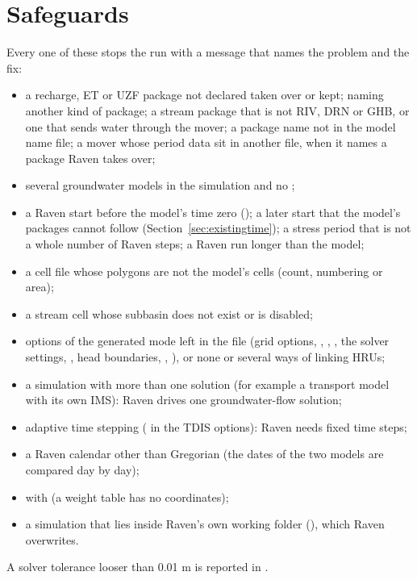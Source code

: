 \section{Safeguards}
Every one of these stops the run with a message that names the problem and the fix:
\begin{itemize}
\item a recharge, ET or UZF package not declared taken over or kept;  naming another kind of package;
      a stream package that is not RIV, DRN or GHB, or one that sends water through the mover; a package name not in the
      model name file; a mover whose period data sit in another file, when it names a package Raven takes over;
\item several groundwater models in the simulation and no ;
\item a Raven start before the model's time zero (); a later start that the model's packages cannot follow (Section~\ref{sec:existingtime}); a stress period that is not a whole number of Raven steps; a Raven run longer than
      the model;
\item a cell file whose polygons are not the model's cells (count, numbering or area);
\item a stream cell whose subbasin does not exist or is disabled;
\item options of the generated mode left in the  file (grid options, , ,
      , the solver settings, , head boundaries, , ),
      or none or several ways of linking HRUs;
\item a simulation with more than one solution (for example a transport model with its own IMS): Raven drives one
      groundwater-flow solution;
\item adaptive time stepping ( in the TDIS options): Raven needs fixed time steps;
\item a Raven calendar other than Gregorian (the dates of the two models are compared day by day);
\item {} with  (a weight table has no coordinates);
\item a simulation that lies inside Raven's own working folder (), which Raven overwrites.
\end{itemize}
A solver tolerance looser than 0.01 m is reported in .

